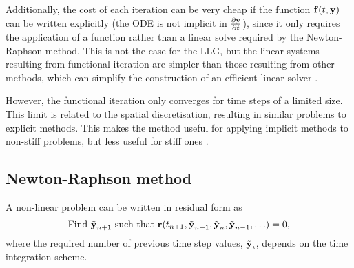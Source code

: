 Additionally, the cost of each iteration can be very cheap if the function ${\boldsymbol{\mathrm{f}}}(t, \boldsymbol{\mathrm{y}})$ can be written explicitly (\ie the ODE is not implicit in $\frac{\partial \boldsymbol{\mathrm{y}}}{\partial t}$), since it only requires the application of a function rather than a linear solve required by the Newton-Raphson method.
This is not the case for the LLG, but the linear systems resulting from functional iteration are simpler than those resulting from other methods, which can simplify the construction of an efficient linear solver \cite{Bartels2006}.

However, the functional iteration only converges for time steps of a limited size.
This limit is related to the spatial discretisation, resulting in similar problems to explicit methods.
This makes the method useful for applying implicit methods to non-stiff problems, but less useful for stiff ones \cite{Iserles2009}.


\subsection{Newton-Raphson method}
\label{sec:newt-raph}

A non-linear problem can be written in residual form as
\begin{equation}
  \text{Find $\tilde{\boldsymbol{\mathrm{y}}}_{n+1}$ such that } \boldsymbol{\mathrm{r}}(t_{n+1}, \tilde{\boldsymbol{\mathrm{y}}}_{n+1}, \tilde{\boldsymbol{\mathrm{y}}}_n, \tilde{\boldsymbol{\mathrm{y}}}_{n-1}, \ldots) = 0,
\end{equation}
where the required number of previous time step values, $\tilde{\boldsymbol{\mathrm{y}}}_i$, depends on the time integration scheme.


